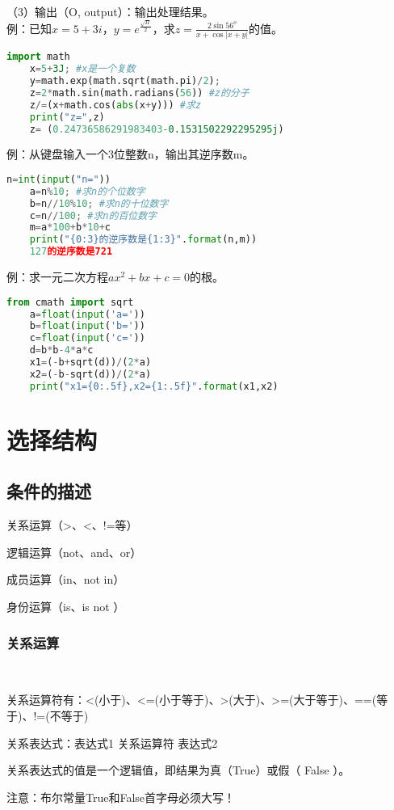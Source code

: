 \documentclass[11pt,a4paper]{article}
\begin{document}
（3）输出（O, output）：输出处理结果。 \\
例：已知$x=5+3i$，$y=e^{\frac{\sqrt{\Pi}}{2}}$，求$z=\frac{2{\sin{56}}^o}{x+\cos{|x+y|}}$的值。
\begin{lstlisting}[language={Python}]
    import math
    x=5+3J; #x是一个复数
    y=math.exp(math.sqrt(math.pi)/2);
    z=2*math.sin(math.radians(56)) #z的分子
    z/=(x+math.cos(abs(x+y))) #求z
    print("z=",z)
    z= (0.24736586291983403-0.1531502292295295j)
\end{lstlisting}
例：从键盘输入一个3位整数n，输出其逆序数m。
\begin{lstlisting}[language={Python}]
    n=int(input("n="))
    a=n%10; #求n的个位数字
    b=n//10%10; #求n的十位数字
    c=n//100; #求n的百位数字
    m=a*100+b*10+c
    print("{0:3}的逆序数是{1:3}".format(n,m))
    127的逆序数是721
\end{lstlisting}
例：求一元二次方程$ax^2+bx+c=0$的根。
\begin{lstlisting}[language={Python}]
    from cmath import sqrt
    a=float(input('a='))
    b=float(input('b='))
    c=float(input('c='))
    d=b*b-4*a*c
    x1=(-b+sqrt(d))/(2*a)
    x2=(-b-sqrt(d))/(2*a)
    print("x1={0:.5f},x2={1:.5f}".format(x1,x2)
\end{lstlisting}
\newpage

\section{选择结构}

\subsection{条件的描述}

关系运算（>、<、!=等）

逻辑运算（not、and、or）

成员运算（in、not in）

身份运算（is、is not ）

\subsubsection{关系运算}~{}

关系运算符有：<(小于)、<=(小于等于)、>(大于)、>=(大于等于)、==(等于)、!=(不等于)

关系表达式：表达式1 关系运算符 表达式2

关系表达式的值是一个逻辑值，即结果为真（True）或假（ False ）。

注意：布尔常量True和False首字母必须大写！
\end{document}
